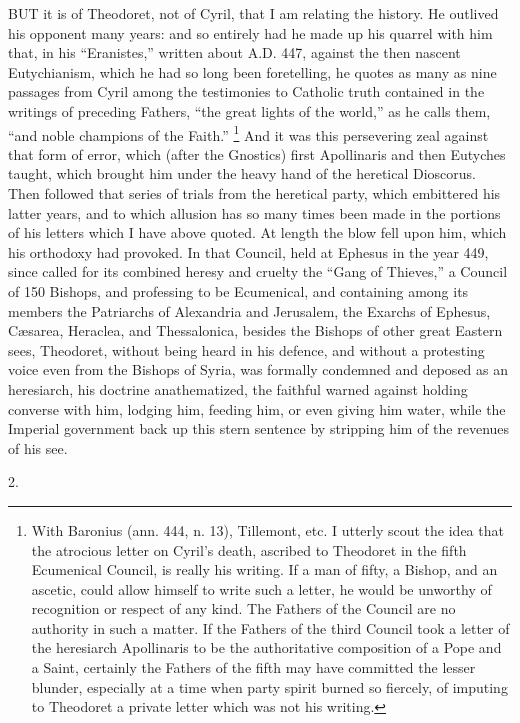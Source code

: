 BUT it is of Theodoret, not of Cyril, that I
am relating the history. He outlived his opponent many years: and so
entirely had he made up his quarrel with him that, in his ``Eranistes,''
written about A.D. 447, against the then nascent
Eutychianism, which he had so long been foretelling, he quotes as many
as nine passages from Cyril among the testimonies to Catholic truth
contained in the writings of preceding Fathers, ``the great lights
of the world,'' as he calls them, ``and noble champions of the
Faith.'' \footnote{With Baronius
(ann. 444, n. 13), Tillemont, etc. I utterly scout the idea that the
atrocious letter on Cyril's death, ascribed to Theodoret in the fifth
Ecumenical Council, is really his writing. If a man of fifty, a
Bishop, and an ascetic, could allow himself to write such a letter, he
would be unworthy of recognition or respect of any kind. The Fathers
of the Council are no authority in such a matter. If the Fathers of
the third Council took a letter of the heresiarch Apollinaris to be
the authoritative composition of a Pope and a Saint, certainly the
Fathers of the fifth may have committed the lesser blunder, especially
at a time when party spirit burned so fiercely, of imputing to
Theodoret a private letter which was not his writing.} And it was
this persevering zeal against that form of error, which (after the
Gnostics) first Apollinaris and then Eutyches taught, which brought
him under the heavy hand of the heretical Dioscorus. Then followed
that series of trials from the heretical party, which embittered his
latter years, and to which allusion has so many times been made in the
portions of his letters which I have above quoted. At length the blow
fell upon him, which his orthodoxy had provoked. In that Council, held
at Ephesus in the year 449, since called for its combined heresy
and cruelty the ``Gang of Thieves,'' a Council of 150 Bishops,
and professing to be Ecumenical, and containing among its members the
Patriarchs of Alexandria and Jerusalem, the Exarchs of Ephesus,
Cæsarea, Heraclea, and Thessalonica, besides the Bishops of other
great Eastern sees, Theodoret, without being heard in his defence, and
without a protesting voice even from the Bishops of Syria, was
formally condemned and deposed as an heresiarch, his doctrine
anathematized, the faithful warned against holding converse with him,
lodging him, feeding him, or even giving him water, while the Imperial
government back up this stern sentence by stripping him of the
revenues of his see.

2.

